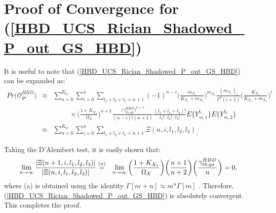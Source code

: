 \section{Proof of Convergence for (\ref{HBD_UCS_Rician_Shadowed_P_out_GS_HBD})} \label{HBD_UCS_Rician_Shadowed_P_out_GS_HBD_conv}
It is useful to note that (\ref{HBD_UCS_Rician_Shadowed_P_out_GS_HBD}) can be expanded as:
\begin{eqnarray}
Pr\big(\mathcal{O}_{gs}^{HBD}\big) & \approx & \sum_{n=0}^{K_{tr}} \sum_{i=0}^n \sum_{l_1 + l_2 + l_3 = n+1} (-1)^{n-i} \bigg(\frac{m_{X_1}}{K_{X_1}+m_{X_1}}\bigg)^{m_{X_1}} \frac{(m_{X_1})_i}{\Gamma^2(i+1)} \bigg(\frac{K_{X_1}}{K_{X_1}+m_{X_1}}\bigg)^{i} \nonumber \\
 & & \hspace{1cm} \times  \bigg(\frac{1+K_{X_1}}{\Omega_X}\bigg)^{n+1} \frac{\big(\gamma_{th,gs}^{HBD}\big)^{n+1}}{(n-i)!(n+1)} \frac{(l_1 + l_2 + l_3)!}{l_1! \cdot l_2! \cdot l_3!} E\{Y_{si,1}^{l_1}\} E\{Y_{si,2}^{l_2}\} \nonumber \\
 & \approx & \sum_{n=0}^{K_{tr}} \sum_{i=0}^n \sum_{l_1 + l_2 + l_3 = n+1} \Xi(n,i,l_1,l_2,l_3)_. \label{HBD_UCS_Rician_Shadowed_P_out_GS_HBD_conv_proof_eq1}
\end{eqnarray}


Taking the D'Alembert test, it is easily shown that:
\begin{eqnarray}
\lim_{n \to \infty} \frac{|\Xi(n+1,i,l_1,l_2,l_3)|}{|\Xi(n,i,l_1,l_2,l_3)|} & \stackrel{(a)}{=} & \lim_{n \to \infty} \bigg(\frac{1+K_{X_1}}{\Omega_X}\bigg) \bigg(\frac{n+1}{n+2}\bigg) \bigg(\frac{\gamma_{th,gs}^{HBD}}{n} \bigg) = 0, \label{HBD_UCS_Rician_Shadowed_P_out_GS_HBD_conv_proof_eq2}
\end{eqnarray}
where (a) is obtained using the identity $\Gamma[m+n] \approx m^n\Gamma[m]$ \cite[eq. (25)]{rached2017unified}. Therefore, (\ref{HBD_UCS_Rician_Shadowed_P_out_GS_HBD}) is absolutely convergent. This completes the proof.

